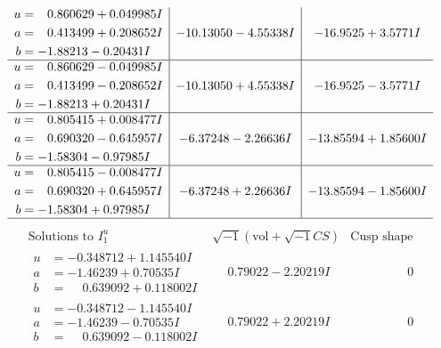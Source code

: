 \documentclass[1p]{elsarticle_modified}
\theoremstyle{definition}
\newcommand{\I}{\sqrt{-1}}
\begin{document}
$$\begin{array}{c|c|c}
\begin{aligned}
u &= \phantom{-}0.860629 + 0.049985 I \\
a &= \phantom{-}0.413499 + 0.208652 I \\
b &= -1.88213 - 0.20431 I\end{aligned}
 & -10.13050 - 4.55338 I & -16.9525 + 3.5771 I \\ \hline\begin{aligned}
u &= \phantom{-}0.860629 - 0.049985 I \\
a &= \phantom{-}0.413499 - 0.208652 I \\
b &= -1.88213 + 0.20431 I\end{aligned}
 & -10.13050 + 4.55338 I & -16.9525 - 3.5771 I \\ \hline\begin{aligned}
u &= \phantom{-}0.805415 + 0.008477 I \\
a &= \phantom{-}0.690320 - 0.645957 I \\
b &= -1.58304 - 0.97985 I\end{aligned}
 & -6.37248 - 2.26636 I & -13.85594 + 1.85600 I \\ \hline\begin{aligned}
u &= \phantom{-}0.805415 - 0.008477 I \\
a &= \phantom{-}0.690320 + 0.645957 I \\
b &= -1.58304 + 0.97985 I\end{aligned}
 & -6.37248 + 2.26636 I & -13.85594 - 1.85600 I\\
 \hline 
 \end{array}$$\newpage$$\begin{array}{c|c|c}  
\text{Solutions to }I^u_{1}& \I (\text{vol} + \sqrt{-1}CS) & \text{Cusp shape}\\
 \hline 
\begin{aligned}
u &= -0.348712 + 1.145540 I \\
a &= -1.46239 + 0.70535 I \\
b &= \phantom{-}0.639092 + 0.118002 I\end{aligned}
 & \phantom{-}0.79022 - 2.20219 I & \phantom{-0.000000 } 0 \\ \hline\begin{aligned}
u &= -0.348712 - 1.145540 I \\
a &= -1.46239 - 0.70535 I \\
b &= \phantom{-}0.639092 - 0.118002 I\end{aligned}
 & \phantom{-}0.79022 + 2.20219 I & \phantom{-0.000000 } 0 \\ \hline\begin{aligned}

\end{aligned}
\end{array}$$
\end{document}
